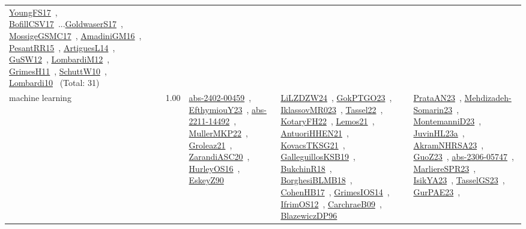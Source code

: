 {\begin{longtable}{p{3cm}r>{\raggedright\arraybackslash}p{6cm}>{\raggedright\arraybackslash}p{6cm}>{\raggedright\arraybackslash}p{8cm}}
\href{../works/YoungFS17.pdf}{YoungFS17}~\cite{YoungFS17}, \href{../works/BofillCSV17.pdf}{BofillCSV17}~\cite{BofillCSV17}...\href{../works/GoldwaserS17.pdf}{GoldwaserS17}~\cite{GoldwaserS17}, \href{../works/MossigeGSMC17.pdf}{MossigeGSMC17}~\cite{MossigeGSMC17}, \href{../works/AmadiniGM16.pdf}{AmadiniGM16}~\cite{AmadiniGM16}, \href{../works/PesantRR15.pdf}{PesantRR15}~\cite{PesantRR15}, \href{../works/ArtiguesL14.pdf}{ArtiguesL14}~\cite{ArtiguesL14}, \href{../works/GuSW12.pdf}{GuSW12}~\cite{GuSW12}, \href{../works/LombardiM12.pdf}{LombardiM12}~\cite{LombardiM12}, \href{../works/GrimesH11.pdf}{GrimesH11}~\cite{GrimesH11}, \href{../works/SchuttW10.pdf}{SchuttW10}~\cite{SchuttW10}, \href{../works/Lombardi10.pdf}{Lombardi10}~\cite{Lombardi10} (Total: 31)\\
\index{machine learning}\index{Algorithms!machine learning}machine learning &  1.00 & \href{../works/abs-2402-00459.pdf}{abs-2402-00459}~\cite{abs-2402-00459}, \href{../works/EfthymiouY23.pdf}{EfthymiouY23}~\cite{EfthymiouY23}, \href{../works/abs-2211-14492.pdf}{abs-2211-14492}~\cite{abs-2211-14492}, \href{../works/MullerMKP22.pdf}{MullerMKP22}~\cite{MullerMKP22}, \href{../works/Groleaz21.pdf}{Groleaz21}~\cite{Groleaz21}, \href{../works/ZarandiASC20.pdf}{ZarandiASC20}~\cite{ZarandiASC20}, \href{../works/HurleyOS16.pdf}{HurleyOS16}~\cite{HurleyOS16}, \href{../works/EskeyZ90.pdf}{EskeyZ90}~\cite{EskeyZ90} & \href{../works/LiLZDZW24.pdf}{LiLZDZW24}~\cite{LiLZDZW24}, \href{../works/GokPTGO23.pdf}{GokPTGO23}~\cite{GokPTGO23}, \href{../works/IklassovMR023.pdf}{IklassovMR023}~\cite{IklassovMR023}, \href{../works/Tassel22.pdf}{Tassel22}~\cite{Tassel22}, \href{../works/KotaryFH22.pdf}{KotaryFH22}~\cite{KotaryFH22}, \href{../works/Lemos21.pdf}{Lemos21}~\cite{Lemos21}, \href{../works/AntuoriHHEN21.pdf}{AntuoriHHEN21}~\cite{AntuoriHHEN21}, \href{../works/KovacsTKSG21.pdf}{KovacsTKSG21}~\cite{KovacsTKSG21}, \href{../works/GalleguillosKSB19.pdf}{GalleguillosKSB19}~\cite{GalleguillosKSB19}, \href{../works/BukchinR18.pdf}{BukchinR18}~\cite{BukchinR18}, \href{../works/BorghesiBLMB18.pdf}{BorghesiBLMB18}~\cite{BorghesiBLMB18}, \href{../works/CohenHB17.pdf}{CohenHB17}~\cite{CohenHB17}, \href{../works/GrimesIOS14.pdf}{GrimesIOS14}~\cite{GrimesIOS14}, \href{../works/IfrimOS12.pdf}{IfrimOS12}~\cite{IfrimOS12}, \href{../works/CarchraeB09.pdf}{CarchraeB09}~\cite{CarchraeB09}, \href{../works/BlazewiczDP96.pdf}{BlazewiczDP96}~\cite{BlazewiczDP96} & \href{../works/PrataAN23.pdf}{PrataAN23}~\cite{PrataAN23}, \href{../works/Mehdizadeh-Somarin23.pdf}{Mehdizadeh-Somarin23}~\cite{Mehdizadeh-Somarin23}, \href{../works/MontemanniD23.pdf}{MontemanniD23}~\cite{MontemanniD23}, \href{../works/JuvinHL23a.pdf}{JuvinHL23a}~\cite{JuvinHL23a}, \href{../works/AkramNHRSA23.pdf}{AkramNHRSA23}~\cite{AkramNHRSA23}, \href{../works/GuoZ23.pdf}{GuoZ23}~\cite{GuoZ23}, \href{../works/abs-2306-05747.pdf}{abs-2306-05747}~\cite{abs-2306-05747}, \href{../works/MarliereSPR23.pdf}{MarliereSPR23}~\cite{MarliereSPR23}, \href{../works/IsikYA23.pdf}{IsikYA23}~\cite{IsikYA23}, \href{../works/TasselGS23.pdf}{TasselGS23}~\cite{TasselGS23}, \href{../works/GurPAE23.pdf}{GurPAE23}~\cite{GurPAE23}, 
\end{longtable}}
